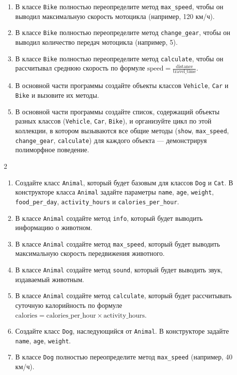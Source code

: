 \begin{enumerate}
\begin{enumerate}
    \item В классе \texttt{Bike} полностью переопределите метод \texttt{max\_speed}, чтобы он выводил максимальную скорость мотоцикла (например, 120 км/ч).
    \item В классе \texttt{Bike} полностью переопределите метод \texttt{change\_gear}, чтобы он выводил количество передач мотоцикла (например, 5).
    \item В классе \texttt{Bike} полностью переопределите метод \texttt{calculate}, чтобы он рассчитывал среднюю скорость по формуле \( \text{speed} = \frac{\text{distance}}{\text{travel\_time}} \).
    \item В основной части программы создайте объекты классов \texttt{Vehicle}, \texttt{Car} и \texttt{Bike} и вызовите их методы.
    \item В основной части программы создайте список, содержащий объекты разных классов (\texttt{Vehicle}, \texttt{Car}, \texttt{Bike}), и организуйте цикл по этой коллекции, в котором вызываются все общие методы (\texttt{show}, \texttt{max\_speed}, \texttt{change\_gear}, \texttt{calculate}) для каждого объекта — демонстрируя полиморфное поведение.
\end{enumerate}
\item[2]
\begin{enumerate}
    \item Создайте класс \texttt{Animal}, который будет базовым для классов \texttt{Dog} и \texttt{Cat}. В конструкторе класса \texttt{Animal} задайте параметры \texttt{name}, \texttt{age}, \texttt{weight}, \texttt{food\_per\_day}, \texttt{activity\_hours} и \texttt{calories\_per\_hour}.
    \item В классе \texttt{Animal} создайте метод \texttt{info}, который будет выводить информацию о животном.
    \item В классе \texttt{Animal} создайте метод \texttt{max\_speed}, который будет выводить максимальную скорость передвижения животного.
    \item В классе \texttt{Animal} создайте метод \texttt{sound}, который будет выводить звук, издаваемый животным.
    \item В классе \texttt{Animal} создайте метод \texttt{calculate}, который будет рассчитывать суточную калорийность по формуле \( \text{calories} = \text{calories\_per\_hour} \times \text{activity\_hours} \).
    \item Создайте класс \texttt{Dog}, наследующийся от \texttt{Animal}. В конструкторе задайте \texttt{name}, \texttt{age}, \texttt{weight}.
    \item В классе \texttt{Dog} полностью переопределите метод \texttt{max\_speed} (например, 40 км/ч).

\end{enumerate}
\end{enumerate}
